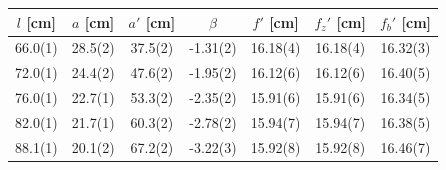 \documentclass[a4paper,11pt]{article}
\begin{document}
            \begin{table}[b]
                \centering
                \begin{tabular}{|c|c|c|c|c|c|c|}
                    \hline
                    $l$ [cm] & $a$ [cm] & $a'$ [cm] & $\beta$ & $f'$ [cm] & $f_z'$ [cm] & $f_b'$ [cm] \\
                    \hline
                    66.0(1) & 28.5(2) & 37.5(2) & -1.31(2) & 16.18(4) & 16.18(4) & 16.32(3)\\
                    \hline
                    72.0(1) & 24.4(2) & 47.6(2) & -1.95(2) & 16.12(6) & 16.12(6) & 16.40(5)\\
                    \hline
                    76.0(1) & 22.7(1) & 53.3(2) & -2.35(2) & 15.91(6) & 15.91(6) & 16.34(5)\\
                    \hline
                    82.0(1) & 21.7(1) & 60.3(2) & -2.78(2) & 15.94(7) & 15.94(7) & 16.38(5)\\
                    \hline
                    88.1(1) & 20.1(2) & 67.2(2) & -3.22(3) & 15.92(8) & 15.92(8) & 16.46(7)\\
                    \hline
                \end{tabular}
                \captionsetup{justification=centering, font=footnotesize}
                \raggedright
            \end{table}
\newpage
\end{document}
